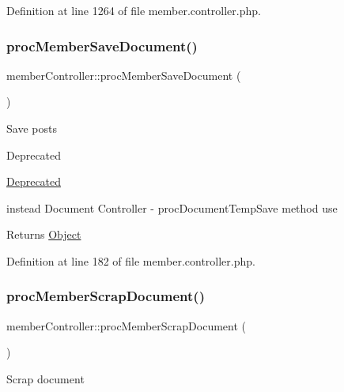Definition at line 1264 of file member.\+controller.\+php.

\hypertarget{classmemberController_abe77500da26f14cd629ca373f94e04d1}{}\label{classmemberController_abe77500da26f14cd629ca373f94e04d1} 
\subsubsection{\texorpdfstring{proc\+Member\+Save\+Document()}{procMemberSaveDocument()}}
{\footnotesize\ttfamily member\+Controller\+::proc\+Member\+Save\+Document (\begin{DoxyParamCaption}{ }\end{DoxyParamCaption})}

Save posts \begin{DoxyRefDesc}{Deprecated}
\item[\hyperlink{deprecated__deprecated000025}{Deprecated}]
\begin{DoxyItemize}
\item instead Document Controller -\/ proc\+Document\+Temp\+Save method use 
\end{DoxyItemize}\end{DoxyRefDesc}
\begin{DoxyReturn}{Returns}
\hyperlink{classObject}{Object} 
\end{DoxyReturn}


Definition at line 182 of file member.\+controller.\+php.

\hypertarget{classmemberController_a7c582f99e2bda6a956a7a2a33a01c6c6}{}\label{classmemberController_a7c582f99e2bda6a956a7a2a33a01c6c6} 
\subsubsection{\texorpdfstring{proc\+Member\+Scrap\+Document()}{procMemberScrapDocument()}}
{\footnotesize\ttfamily member\+Controller\+::proc\+Member\+Scrap\+Document (\begin{DoxyParamCaption}{ }\end{DoxyParamCaption})}

Scrap document

